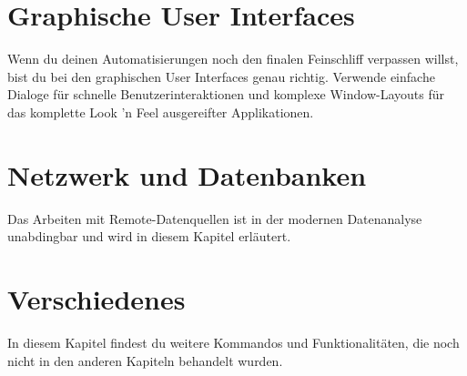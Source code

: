 \documentclass[DIV=17, parskip=half]{scrreprt}
\begin{document}
	\chapter{Graphische User Interfaces}
		Wenn du deinen Automatisierungen noch den finalen Feinschliff verpassen willst, bist du bei den graphischen User Interfaces genau richtig. Verwende einfache Dialoge f\"ur schnelle Benutzerinteraktionen und komplexe Window-Layouts f\"ur das komplette Look 'n Feel ausgereifter Applikationen.
		
		
	
	\chapter{Netzwerk und Datenbanken}
		Das Arbeiten mit Remote-Datenquellen ist in der modernen Datenanalyse unabdingbar und wird in diesem Kapitel erl\"autert.
		
		
		
	\chapter{Verschiedenes}
		In diesem Kapitel findest du weitere Kommandos und Funktionalit\"aten, die noch nicht in den anderen Kapiteln behandelt wurden.
		
		
		
		
		
\end{document}
